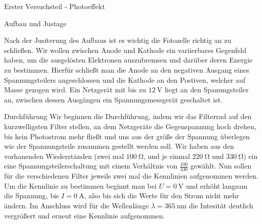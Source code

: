 \documentclass[pdftex, a4paper,11pt, twoside, ngerman]{report}
\begin{document}
\begin{chapter}{Erster Versuchsteil - Photoeffekt}
\begin{section}{Aufbau und Justage}
\begin{figure}[htbp]
\begin{center}
        \end{center}
      \end{figure}
      Nach der Jusiterung des Aufbaus ist es wichtig die Fotozelle richtig an zu schließen. Wir wollen zwischen Anode und Kathode ein variierbares Gegenfeld haben, um die ausgelösten Elektronen auszubremsen und darüber deren Energie zu bestimmen. Hierfür schließt man die Anode an den negativen Ausgang eines Spannungsteilers angeschlossen und die Kathode an den Postiven, welcher auf Masse gezogen wird. Ein Netzgerät mit bis zu $\SI{12}{\volt}$ liegt an den Spanungsteiler an, zwischen dessen Ausgängen ein Spannungsmessgerät geschaltet ist.
    \end{section}
    
    
    
    \begin{section}{Durchführung}
      \label{chp:Photoeffekt:sec:Durchfuehrung}
      Wir beginnen die Durchführung, indem wir das Filterrad auf den kurzwelligsten Filter stellen, an dem Netzgeräte die Gegenspannung hoch drehen, bis kein Photostrom mehr fließt und uns aus der größe der Spannung überlegen wie der Spannungsteile zusammen gestellt werden soll. Wir haben aus den vorhanenden Wiederständen (zwei mal $\SI{100}{\ohm}$, und je einmal $\SI{220}{\ohm}$ und $\SI{330}{\ohm}$) ein eine Spannungsteilerschaltung mit einem Verhältnis von $\frac{100}{330}$ gewählt. Nun sollen für die verschiedenen Filter jeweils zwei mal die Kennlinien aufgenommen werden.
      Um die Kennlinie zu bestimmen beginnt man bei $U=\SI{0}{\volt}$ und erhöht langsam die Spannung, bis $I=\SI{0}{\ampere}$, also bis sich die Werte für den Strom nicht mehr ändern. Im Anschluss wird für die Wellenlänge $\lambda = \SI{365}{\nano\meter}$ die Intesität deutlich vergrößert und erneut eine Kennlinie aufgenommen.
      
      
      
    \end{section}
    
    
    

\end{chapter}
\end{document}
